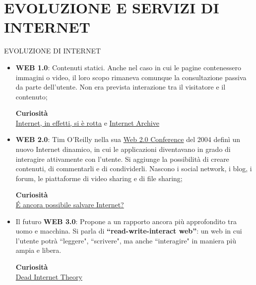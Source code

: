 \documentclass[aspectratio=1610]{beamer}
\begin{document}
\section{EVOLUZIONE E SERVIZI DI INTERNET}

\begin{frame}{EVOLUZIONE DI INTERNET}
    \begin{itemize}
        \justifying
        \item \textbf{WEB 1.0}: Contenuti statici. Anche nel caso in cui le pagine contenessero immagini o video, 
        il loro scopo rimaneva comunque la consultazione passiva da parte dell’utente. Non era prevista 
        interazione tra il visitatore e il contenuto;\\
        \begin{tiny}
            \raggedleft
            \textbf{Curiosità}\\
            \href{https://www.ilpost.it/massimomantellini/2021/10/11/internet-in-effetti-si-e-rotta/}{Internet, in effetti, si è rotta} e 
            \href{https://archive.org/}{Internet Archive}\\
        \end{tiny}
        \pause
        \item \textbf{WEB 2.0}: Tim O’Reilly nella sua \href{https://en.wikipedia.org/wiki/Web\_2.0\_Summit}{Web 2.0 Conference} del 2004 definì un nuovo Internet 
        dinamico, in cui le applicazioni diventavano in grado di interagire attivamente con l’utente. Si aggiunge 
        la possibilità di creare contenuti, di commentarli e di condividerli. Nascono i social network, i blog, 
        i forum, le piattaforme di video sharing e di file sharing;\\
        \begin{tiny}
            \raggedleft
            \textbf{Curiosità}\\
            \href{https://quantsmagazine.com/2024/10/e-ancora-possibile-salvare-internet/}{\'E ancora possibile salvare Internet?}\\
        \end{tiny}
        \pause
        \item Il futuro \textbf{WEB 3.0}: Propone a un rapporto ancora più approfondito tra uomo e macchina. 
        Si parla di \textbf{“read-write-interact web”}: un web in cui l’utente potrà ``leggere", ``scrivere", ma 
        anche ``interagire" in maniera più ampia e libera.\\
        \begin{tiny}
            \raggedleft
            \textbf{Curiosità}\\
            \href{https://it.wikipedia.org/wiki/Teoria_di_Internet_morto}{Dead Internet Theory}\\
        \end{tiny}
    \end{itemize}
\end{frame}
\end{document}
